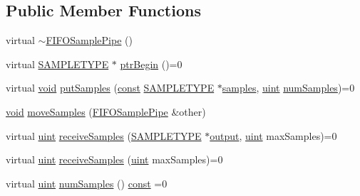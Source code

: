 \subsection*{Public Member Functions}
\begin{DoxyCompactItemize}
\item 
virtual \hyperlink{classsoundtouch_1_1_f_i_f_o_sample_pipe_a3525d161e1b4c3faaccc2a7f0a39f7a5}{$\sim$\+F\+I\+F\+O\+Sample\+Pipe} ()
\item 
virtual \hyperlink{namespacesoundtouch_a97cfd29a7abb4d4b2a72f803d5b5850c}{S\+A\+M\+P\+L\+E\+T\+Y\+PE} $\ast$ \hyperlink{classsoundtouch_1_1_f_i_f_o_sample_pipe_a0bd71a22866c112456222a38306df12c}{ptr\+Begin} ()=0
\item 
virtual \hyperlink{sound_8c_ae35f5844602719cf66324f4de2a658b3}{void} \hyperlink{classsoundtouch_1_1_f_i_f_o_sample_pipe_a23601da7b73a0b353fc0014433341cfb}{put\+Samples} (\hyperlink{getopt1_8c_a2c212835823e3c54a8ab6d95c652660e}{const} \hyperlink{namespacesoundtouch_a97cfd29a7abb4d4b2a72f803d5b5850c}{S\+A\+M\+P\+L\+E\+T\+Y\+PE} $\ast$\hyperlink{test__w__saw8_8c_a54185623a5a093f671a73e5fba6197a1}{samples}, \hyperlink{_s_t_types_8h_a91ad9478d81a7aaf2593e8d9c3d06a14}{uint} \hyperlink{classsoundtouch_1_1_f_i_f_o_sample_pipe_aa151eb183932d9bad454a72d18f3a1ee}{num\+Samples})=0
\item 
\hyperlink{sound_8c_ae35f5844602719cf66324f4de2a658b3}{void} \hyperlink{classsoundtouch_1_1_f_i_f_o_sample_pipe_a081941881e2c75dc5cb8a6f214e7242e}{move\+Samples} (\hyperlink{classsoundtouch_1_1_f_i_f_o_sample_pipe}{F\+I\+F\+O\+Sample\+Pipe} \&other)
\item 
virtual \hyperlink{_s_t_types_8h_a91ad9478d81a7aaf2593e8d9c3d06a14}{uint} \hyperlink{classsoundtouch_1_1_f_i_f_o_sample_pipe_a734e46ab148959a737c12266db6236fa}{receive\+Samples} (\hyperlink{namespacesoundtouch_a97cfd29a7abb4d4b2a72f803d5b5850c}{S\+A\+M\+P\+L\+E\+T\+Y\+PE} $\ast$\hyperlink{mm_8c_aeb3fcf4ab0f02cc4420e5a97568a07ef}{output}, \hyperlink{_s_t_types_8h_a91ad9478d81a7aaf2593e8d9c3d06a14}{uint} max\+Samples)=0
\item 
virtual \hyperlink{_s_t_types_8h_a91ad9478d81a7aaf2593e8d9c3d06a14}{uint} \hyperlink{classsoundtouch_1_1_f_i_f_o_sample_pipe_ab9b4815e415d46fe6bf56f5cdcb646b2}{receive\+Samples} (\hyperlink{_s_t_types_8h_a91ad9478d81a7aaf2593e8d9c3d06a14}{uint} max\+Samples)=0
\item 
virtual \hyperlink{_s_t_types_8h_a91ad9478d81a7aaf2593e8d9c3d06a14}{uint} \hyperlink{classsoundtouch_1_1_f_i_f_o_sample_pipe_aa151eb183932d9bad454a72d18f3a1ee}{num\+Samples} () \hyperlink{getopt1_8c_a2c212835823e3c54a8ab6d95c652660e}{const}  =0

\end{DoxyCompactItemize}
